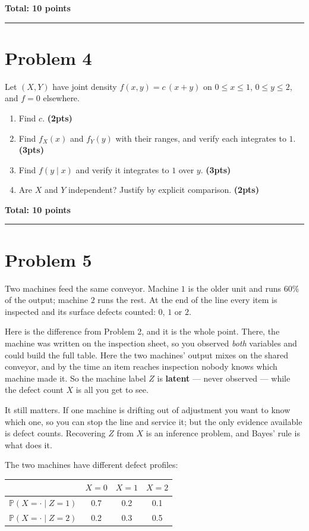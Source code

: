 \documentclass[11pt,a4paper]{article}
\newcommand{\pts}[1]{\hfill\textbf{(#1pts)}}
\newcommand{\total}[1]{\par\medskip\noindent\textbf{Total: #1 points}}
\newcommand{\PP}{\mathbb{P}}
\newenvironment{parts}
  {\begin{enumerate}\setlength{\itemsep}{0.45em}\setlength{\parskip}{0pt}}
  {\end{enumerate}}
\begin{document}
\total{10}

\bigskip
\hrule
\bigskip

\section*{Problem 4}

Let $(X,Y)$ have joint density $f(x,y) = c\,(x+y)$ on $0 \le x \le 1$,
$0 \le y \le 2$, and $f = 0$ elsewhere.

\begin{parts}
  \item Find $c$. \pts{2}
  \item Find $f_X(x)$ and $f_Y(y)$ with their ranges, and verify each integrates
        to $1$. \pts{3}
  \item Find $f(y \mid x)$ and verify it integrates to $1$ over $y$. \pts{3}
  \item Are $X$ and $Y$ independent? Justify by explicit comparison. \pts{2}
\end{parts}

\total{10}

\bigskip
\hrule
\bigskip

\section*{Problem 5}

Two machines feed the same conveyor. Machine $1$ is the older unit and runs
$60\%$ of the output; machine $2$ runs the rest. At the end of the line every
item is inspected and its surface defects counted: $0$, $1$ or $2$.

Here is the difference from Problem 2, and it is the whole point. There, the
machine was written on the inspection sheet, so you observed \emph{both}
variables and could build the full table. Here the two machines' output mixes on
the shared conveyor, and by the time an item reaches inspection nobody knows
which machine made it. So the machine label $Z$ is \textbf{latent} — never
observed — while the defect count $X$ is all you get to see.

It still matters. If one machine is drifting out of adjustment you want to know
which one, so you can stop the line and service it; but the only evidence
available is defect counts. Recovering $Z$ from $X$ is an inference problem, and
Bayes' rule is what does it.

The two machines have different defect profiles:

\begin{center}
\begin{tabular}{lccc}
\toprule
                            & $X=0$ & $X=1$ & $X=2$ \\
\midrule
$\PP(X = \cdot \mid Z = 1)$ & 0.7 & 0.2 & 0.1 \\
$\PP(X = \cdot \mid Z = 2)$ & 0.2 & 0.3 & 0.5 \\
\bottomrule
\end{tabular}
\end{center}
\end{document}
